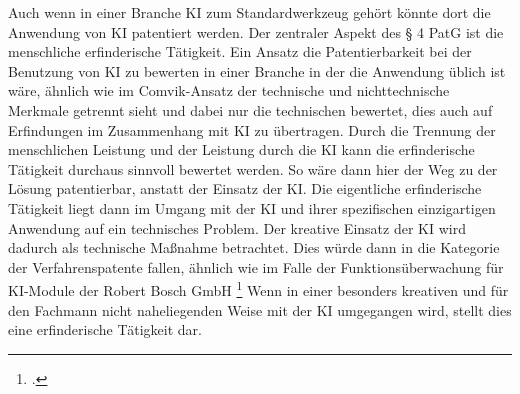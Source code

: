 Auch wenn in einer Branche KI zum Standardwerkzeug gehört
könnte dort die Anwendung von KI patentiert werden.
Der zentraler Aspekt 
des § 4 PatG ist die menschliche erfinderische Tätigkeit.
Ein Ansatz die Patentierbarkeit bei der Benutzung 
von KI zu bewerten in einer Branche in der die Anwendung 
üblich ist wäre, ähnlich wie im Comvik-Ansatz
der technische
und nichttechnische Merkmale getrennt sieht
und dabei nur die technischen bewertet, dies auch 
auf Erfindungen im Zusammenhang mit KI zu übertragen.
Durch die Trennung der menschlichen Leistung und 
der Leistung durch die KI kann die erfinderische Tätigkeit 
durchaus sinnvoll bewertet werden.
So wäre dann hier der Weg zu der Lösung patentierbar, anstatt der
Einsatz der KI.
Die eigentliche erfinderische Tätigkeit liegt dann im Umgang mit der KI 
und ihrer spezifischen einzigartigen Anwendung auf ein technisches Problem.
Der kreative Einsatz der KI wird dadurch 
als technische Maßnahme betrachtet. 
Dies würde dann in die Kategorie der Verfahrenspatente fallen,
ähnlich wie im Falle der Funktionsüberwachung für KI-Module
der Robert Bosch GmbH \footcite{DPMAregisterOriginaldokumentDE102017212328A1}
Wenn in einer besonders kreativen und für den Fachmann
nicht naheliegenden Weise mit der KI umgegangen wird, stellt 
dies eine erfinderische Tätigkeit dar.
\\
